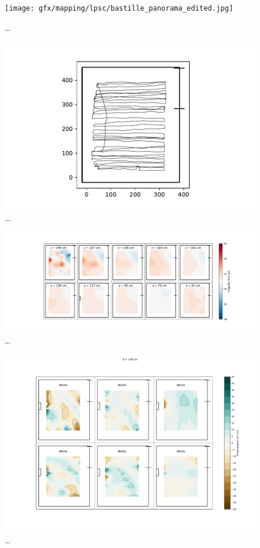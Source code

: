 \begin{figure}
  \centering
  \texttt{[image: gfx/mapping/lpsc/bastille\_panorama\_edited.jpg]}
  \caption{\ldots}
  \label{fig:mapping_bastille_panorama}
\end{figure}

\begin{figure}
  \centering
  \includegraphics[width=0.9\linewidth]{gfx/mapping/lpsc/bastille_crane_away_rep_track.pdf}
  \caption{\ldots}
  \label{fig:mapping_bastille_track}
\end{figure}

\begin{figure}
  \centering
  \includegraphics[width=0.9\linewidth]{gfx/mapping/lpsc/bastille_crane_away_rep_magnitude.pdf}
  \caption{\ldots}
  \label{fig:mapping_bastille_magnitude}
\end{figure}

\begin{figure}
  \centering
  \includegraphics[width=0.9\linewidth]{gfx/mapping/lpsc/bastille_crane_away_rep_gradient_139cm.pdf}
  \caption{\ldots}
  \label{fig:mapping_bastille_magnitude}
\end{figure}

